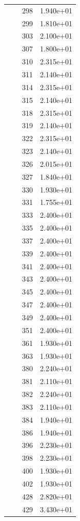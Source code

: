 \documentclass[12pt]{article}
\begin{document}
\begin{longtable}{@{}cccc@{}}
 &  & 298 & 1.940e+01 \\
 &  & 299 & 1.810e+01 \\
 &  & 303 & 2.100e+01 \\
 &  & 307 & 1.800e+01 \\
 &  & 310 & 2.315e+01 \\
 &  & 311 & 2.140e+01 \\
 &  & 314 & 2.315e+01 \\
 &  & 315 & 2.140e+01 \\
 &  & 318 & 2.315e+01 \\
 &  & 319 & 2.140e+01 \\
 &  & 322 & 2.315e+01 \\
 &  & 323 & 2.140e+01 \\
 &  & 326 & 2.015e+01 \\
 &  & 327 & 1.840e+01 \\
 &  & 330 & 1.930e+01 \\
 &  & 331 & 1.755e+01 \\
 &  & 333 & 2.400e+01 \\
 &  & 335 & 2.400e+01 \\
 &  & 337 & 2.400e+01 \\
 &  & 339 & 2.400e+01 \\
 &  & 341 & 2.400e+01 \\
 &  & 343 & 2.400e+01 \\
 &  & 345 & 2.400e+01 \\
 &  & 347 & 2.400e+01 \\
 &  & 349 & 2.400e+01 \\
 &  & 351 & 2.400e+01 \\
 &  & 361 & 1.930e+01 \\
 &  & 363 & 1.930e+01 \\
 &  & 380 & 2.240e+01 \\
 &  & 381 & 2.110e+01 \\
 &  & 382 & 2.240e+01 \\
 &  & 383 & 2.110e+01 \\
 &  & 384 & 1.940e+01 \\
 &  & 386 & 1.940e+01 \\
 &  & 396 & 2.230e+01 \\
 &  & 398 & 2.230e+01 \\
 &  & 400 & 1.930e+01 \\
 &  & 402 & 1.930e+01 \\
 &  & 428 & 2.820e+01 \\
 &  & 429 & 3.430e+01 \\

\end{longtable}
\end{document}
